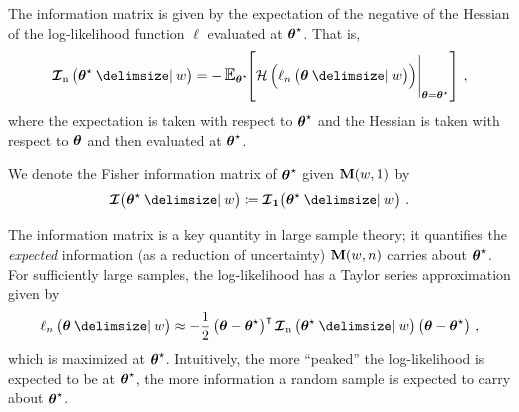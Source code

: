 \documentclass[
    11pt,
    extrafontsizes,
    article,
    oldfontcommands,
    final,
    oneside,
    openany,
    hidelinks]{memoir}
\begin{document}
\begin{definition}
The information matrix is given by the expectation of the negative of the Hessian of the log-likelihood function $\ell$ evaluated at ${\boldsymbol{\mathbf{\theta}}}^{\star}$. That is,
\begin{equation}
\label{eq:info_matrix}
    \infomatrxn\left(\tparam\sysparamvec\Given w\right) = -\operatorname{\mathlarger{\expectation}_{\tparam\sysparamvec}}\!\!
    \left[
        \eval
        {
            \hessian \left(
                \ell_n\left(\sysparamvec \Given w \right)
            \right)
        }_{\sysparamvec=\tparam\sysparamvec} 
    \right ]\,,
\end{equation}
where the expectation is taken with respect to ${\boldsymbol{\mathbf{\theta}}}^{\star}$ and the Hessian is taken with respect to $\boldsymbol{\mathbf{\theta}}$ and then evaluated at ${\boldsymbol{\mathbf{\theta}}}^{\star}$.
\end{definition}

\begin{notation}
We denote the Fisher information matrix of ${\boldsymbol{\mathbf{\theta}}}^{\star}$ given $\boldsymbol{\mathbf{M}}(w,{1})$ by
\begin{equation}
   \infomatrx\!\left(\tparam\sysparamvec \Given w\right) \coloneqq \infomatrxni{1}\!\left(\tparam\sysparamvec \Given w\right)\,.
\end{equation}
\end{notation}

The information matrix is a key quantity in large sample theory; it quantifies the \emph{expected} information (as a reduction of uncertainty) $\boldsymbol{\mathbf{M}}(w,n)$ carries about ${\boldsymbol{\mathbf{\theta}}}^{\star}$.
For sufficiently large samples, the log-likelihood has a Taylor series approximation given by
\begin{equation}
    \ell_n\left(\sysparamvec \Given w\right) \approx -\frac{1}{2}\left(\sysparamvec - \tparam\sysparamvec\right)^\intercal \infomatrxn\left(\tparam\sysparamvec \Given w\right)\left(\sysparamvec - \tparam\sysparamvec\right)\,,
\end{equation}
which is maximized at ${\boldsymbol{\mathbf{\theta}}}^{\star}$.
Intuitively, the more ``peaked'' the log-likelihood is expected to be at ${\boldsymbol{\mathbf{\theta}}}^{\star}$, the more information a random sample is expected to carry about ${\boldsymbol{\mathbf{\theta}}}^{\star}$.
\end{document}
